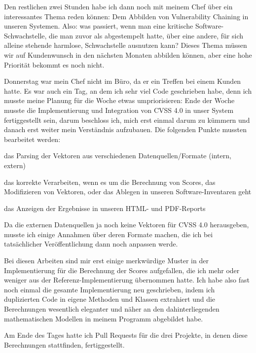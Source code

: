 Den restlichen zwei Stunden habe ich dann noch mit meinem Chef über ein interessantes Thema reden können: Dem Abbilden von Vulnerability Chaining in unseren Systemen.
Also: was passiert, wenn man eine kritische Software-Schwachstelle, die man zuvor als  abgestempelt hatte, über eine andere, für sich alleine stehende harmlose, Schwachstelle ausnutzen kann?
Dieses Thema müssen wir auf Kundenwunsch in den nächsten Monaten abbilden können, aber eine hohe Priorität bekommt es noch nicht.

Donnerstag war mein Chef nicht im Büro, da er ein Treffen bei einem Kunden hatte.
Es war auch ein Tag, an dem ich sehr viel Code geschrieben habe, denn ich musste meine Planung für die Woche etwas umpriorisieren:
Ende der Woche musste die Implementierung und Integration von CVSS 4.0 in unser System fertiggestellt sein, darum beschloss ich, mich erst einmal darum zu kümmern und danach erst weiter mein Verständnis aufzubauen.
Die folgenden Punkte mussten bearbeitet werden:

\begin{smitemize}
    \item das Parsing der Vektoren aus verschiedenen Datenquellen/Formate (intern, extern)
    \item das korrekte Verarbeiten, wenn es um die Berechnung von Scores, das Modifizieren von Vektoren, oder das Ablegen in unseren Software-Inventaren geht
    \item das Anzeigen der Ergebnisse in unseren HTML- und PDF-Reports
\end{smitemize}

Da die externen Datenquellen ja noch keine Vektoren für CVSS 4.0 herausgeben, musste ich einige Annahmen über deren Formate machen, die ich bei tatsächlicher Veröffentlichung dann noch anpassen werde.

Bei diesen Arbeiten sind mir erst einige merkwürdige Muster in der Implementierung für die Berechnung der Scores aufgefallen, die ich mehr oder weniger aus der Referenz-Implementierung übernommen hatte.
Ich habe also fast noch einmal die gesamte Implementierung neu geschrieben, indem ich duplizierten Code in eigene Methoden und Klassen extrahiert und die Berechnungen wesentlich eleganter und näher an den dahinterliegenden mathematischen Modellen in meinem Programm abgebildet habe.

Am Ende des Tages hatte ich Pull Requests für die drei Projekte, in denen diese Berechnungen stattfinden, fertiggestellt.

